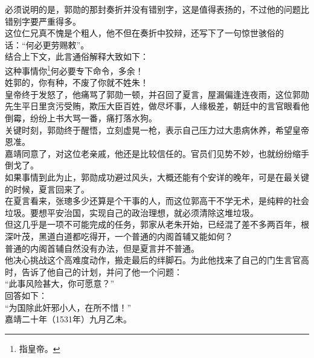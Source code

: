 \begin{multicols}{\theparacolNo}
必须说明的是，郭勋的那封奏折并没有错别字，这是值得表扬的，不过他的问题比错别字要严重得多。\\

这位仁兄真不愧是个粗人，他不但在奏折中狡辩，还写下了一句惊世骇俗的话：“何必更劳赐敕”。\\

结合上下文，此言通俗解释大致如下：\\

这种事情你\footnote{指皇帝。}何必要专下命令，多余！\\

姓郭的，你有种，不废了你就不姓朱！\\

皇帝终于发怒了，他痛骂了郭勋一顿，并召回了夏言，屋漏偏逢连夜雨，这位郭勋先生平日里贪污受贿，欺压大臣百姓，做尽坏事，人缘极差，朝廷中的言官眼看他倒霉，纷纷上书大骂一番，痛打落水狗。\\

关键时刻，郭勋终于醒悟，立刻虚晃一枪，表示自己压力过大患病休养，希望皇帝恩准。\\

嘉靖同意了，对这位老亲戚，他还是比较信任的。官员们见势不妙，也就纷纷缩手倒戈了。\\

如果事情到此为止，郭勋成功避过风头，大概还能有个安详的晚年，可是在最关键的时候，夏言回来了。\\

在夏言看来，张璁多少还算是个干事的人，而这位郭高干不学无术，是纯粹的社会垃圾。要想平安治国，实现自己的政治理想，就必须清除这堆垃圾。\\

但这几乎是一项不可能完成的任务，郭家从老朱开始，已经混了差不多两百年，根深叶茂，黑道白道都吃得开，一个普通的内阁首辅又能如何？\\

普通的内阁首辅自然没有办法，但是夏言并不普通。\\

他决心挑战这个高难度动作，搬走最后的绊脚石。为此他找来了自己的门生言官高时，告诉了他自己的计划，并问了他一个问题：\\

“此事风险甚大，你可愿意？”\\

回答如下：\\

“为国除此奸邪小人，在所不惜！”\\

嘉靖二十年（1531年）九月乙未。\\


\end{multicols}
